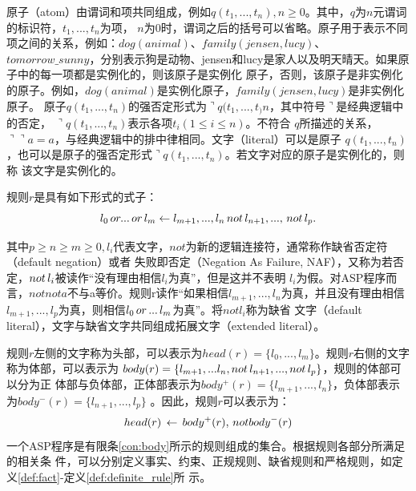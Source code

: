 原子（atom）由谓词和项共同组成，例如$q(t_1,...,t_n),n \geq 0$。其中，$q$为$n$元谓词的标识符，$t_1,...,t_n$为项，
$n$为0时，谓词之后的括号可以省略。原子用于表示不同项之间的关系，例如：$dog(animal)$、$family(jensen,lucy)$、
$tomorrow\_sunny$，分别表示狗是动物、jensen和lucy是家人以及明天晴天。如果原子中的每一项都是实例化的，则该原子是实例化
原子，否则，该原子是非实例化的原子。例如，$dog(animal)$是实例化原子，$family(jensen,lucy)$是非实例化原子。
原子$q(t_1,...,t_n)$的强否定形式为$\urcorner q(t_1,...,t_)n$，其中符号$\urcorner$是经典逻辑中的否定，
$\urcorner q(t_1,...,t_n)$表示各项$t_i(1 \leq i \leq n)$。不符合
$q$所描述的关系，$\urcorner \urcorner a = a$，与经典逻辑中的排中律相同。文字（literal）可以是原子
$q(t_1,...,t_n)$，也可以是原子的强否定形式$\urcorner q(t_1,...,t_n)$。若文字对应的原子是实例化的，则称
该文字是实例化的。

\begin{definition}[规则] 规则$r$是具有如下形式的式子：
    \begin{equation}
        l_0 \thinspace or ... \thinspace or \thinspace l_m \leftarrow l_{m+1},...,l_n \thinspace not \thinspace l_{n+1},...,\thinspace not \thinspace l_p.
    \end{equation}
\end{definition}

其中$p \ge n \ge m \geq 0, l_i$代表文字，$not$为新的逻辑连接符，通常称作缺省否定符（default negation）或者
失败即否定（Negation As Failure, NAF），又称为若否定，$not \thinspace l_i$被读作“没有理由相信$l_i$为真”，但是这并不表明
$l_i$为假。对ASP程序而言，$not not a$不与a等价。规则r读作“如果相信$l_{m+1},...,l_n$为真，并且没有理由相信
$l_{m+1},...,l_p$为真，则相信$l_0 \thinspace or \thinspace ... \thinspace l_m$为真”。将$not l_i$称为缺省
文字（default literal），文字与缺省文字共同组成拓展文字（extended literal）。

规则$r$左侧的文字称为头部，可以表示为$head(r) = \{ l_0,...,l_m \}$。规则$r$右侧的文字称为体部，可以表示为
$body(r) = \{ l_{m+1},...l_n,not \thinspace l_{n+1},..., not \thinspace l_p \}$，规则的体部可以分为正
体部与负体部，正体部表示为$body^+(r) = \{ l_{m+1},...,l_n \}$，负体部表示为$body^-(r)=\{ l_{n+1},...,l_p \}$
。因此，规则$r$可以表示为：
\begin{equation}
    head(r) \thinspace \leftarrow \thinspace body^+(r), \thinspace not body^-(r) \label{con:body}
\end{equation}
一个ASP程序是有限条\eqref{con:body}所示的规则组成的集合。根据规则各部分所满足的相关条
件，可以分别定义事实、约束、正规规则、缺省规则和严格规则，如定义\eqref{def:fact}-定义\eqref{def:definite_rule}所
示。


